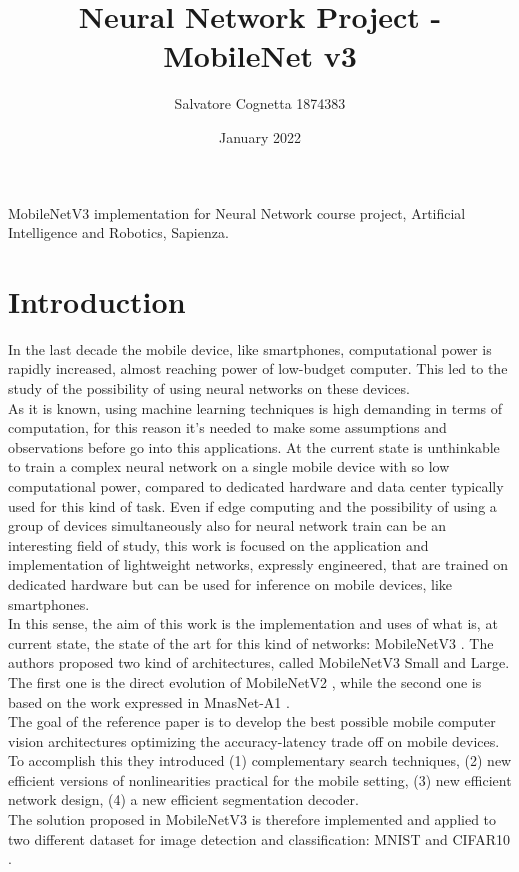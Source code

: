 \documentclass[12pt, letterpaper, twoside]{article}
\title{Neural Network Project - MobileNet v3}
\author{Salvatore Cognetta 1874383}
\date{January 2022}
\begin{document}
\begin{titlepage}
\maketitle
\end{titlepage}

\clearpage
\thispagestyle{empty}
\vspace*{\fill}
MobileNetV3 implementation for Neural Network course project, Artificial Intelligence and Robotics, Sapienza.
\vspace*{\fill}
\clearpage


\tableofcontents

\clearpage
    
\clearpage
\section{Introduction}
In the last decade the mobile device, like smartphones, computational power is rapidly increased, almost reaching power of low-budget computer. This led to the study of the possibility of using neural networks on these devices.\\
As it is known, using machine learning techniques is high demanding in terms of computation, for this reason it's needed to make some assumptions and observations before go into this applications. At the current state is unthinkable to train a complex neural network on a single mobile device with so low computational power, compared to dedicated hardware and data center typically used for this kind of task. Even if edge computing and the possibility of using a group of devices simultaneously also for neural network train can be an interesting field of study, this work is focused on the application and implementation of lightweight networks, expressly engineered, that are trained on dedicated hardware but can be used for inference on mobile devices, like smartphones.\\

In this sense, the aim of this work is the implementation and uses of what is, at current state, the state of the art for this kind of networks: MobileNetV3 \cite{howard2019searching}. The authors proposed two kind of architectures, called MobileNetV3 Small and Large. The first one is the direct evolution of MobileNetV2 \cite{sandler2019mobilenetv2}, while the second one is based on the work expressed in MnasNet-A1 \cite{tan2019mnasnet}. \\

The goal of the reference paper is to develop the best possible mobile computer vision architectures optimizing the accuracy-latency trade off on mobile devices. To accomplish this they introduced (1) complementary search techniques, (2) new efficient versions of nonlinearities practical for the mobile setting, (3) new efficient network design, (4) a new efficient segmentation decoder.\\
The solution proposed in MobileNetV3 is therefore implemented and applied to two different dataset for image detection and classification: MNIST \cite{deng2012mnist} and CIFAR10 \cite{Krizhevsky09learningmultiple}.
\end{document}
